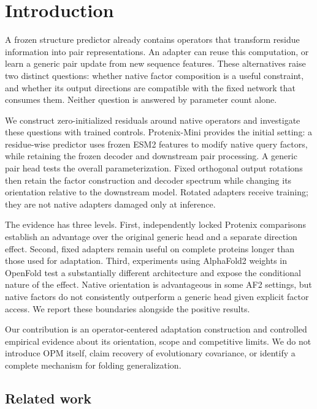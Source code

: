 \section{Introduction}
\label{sec:1}
A frozen structure predictor already contains operators that transform residue
information into pair representations. An adapter can reuse this computation,
or learn a generic pair update from new sequence features. These alternatives
raise two distinct questions: whether native factor composition is a useful
constraint, and whether its output directions are compatible with the fixed
network that consumes them. Neither question is answered by parameter count alone.

We construct zero-initialized residuals around native operators and investigate
these questions with trained controls. Protenix-Mini provides the initial setting:
a residue-wise predictor uses frozen ESM2 features to modify native query factors,
while retaining the frozen decoder and downstream pair processing. A generic
pair head tests the overall parameterization. Fixed orthogonal output rotations
then retain the factor construction and decoder spectrum while changing its
orientation relative to the downstream model. Rotated adapters receive training;
they are not native adapters damaged only at inference.

The evidence has three levels. First, independently locked Protenix comparisons
establish an advantage over the original generic head and a separate direction
effect. Second, fixed adapters remain useful on complete proteins longer than
those used for adaptation. Third, experiments using AlphaFold2 weights in
OpenFold test a substantially different architecture and expose the conditional
nature of the effect. Native orientation is advantageous in some AF2 settings,
but native factors do not consistently outperform a generic head given explicit
factor access. We report these boundaries alongside the positive results.

Our contribution is an operator-centered adaptation construction and controlled
empirical evidence about its orientation, scope and competitive limits. We do
not introduce OPM itself, claim recovery of evolutionary covariance, or identify
a complete mechanism for folding generalization.

\subsection{Related work}\label{related-work}

